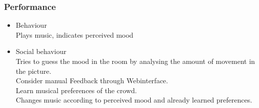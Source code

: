 \documentclass{article}
\begin{document}
\subsubsection{Performance}
\begin{itemize}
    \item Behaviour\\
        Plays music, indicates perceived mood
    \item Social behaviour\\
	    Tries to guess the mood in the room by analysing the amount of movement in the picture. \\
	    Consider manual Feedback through Webinterface.\\
	    Learn musical preferences of the crowd.\\
	    Changes music according to perceived mood and already learned preferences.\\
\end{itemize}

\end{document}
